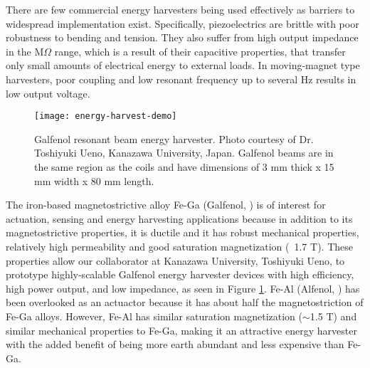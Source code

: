 There are few commercial energy harvesters being used effectively as barriers to widespread implementation exist. Specifically, piezoelectrics are brittle with poor robustness to bending and tension. They also suffer from high output impedance in the M$\Omega$ range, which is a result of their capacitive properties, that transfer only small amounts of electrical energy to external loads. In moving-magnet type harvesters, poor coupling and low resonant frequency up to several Hz results in low output voltage. 
\begin{figure}[h!] %
	\centering
	\texttt{[image: energy-harvest-demo]}
	\caption{Galfenol resonant beam energy harvester. Photo courtesy of Dr. Toshiyuki Ueno, Kanazawa University, Japan. Galfenol beams are in the same region as the coils and have dimensions of 3 mm thick x 15 mm width x 80 mm length.\cite{Slaughter2011}}
	\label{fig:energy-harvest-demo}
\end{figure}
The iron-based magnetostrictive alloy Fe-Ga (Galfenol, \fegacomp) is of interest for actuation, sensing and energy harvesting applications because in addition to its magnetostrictive properties, it is ductile and it has robust mechanical properties\cite{Clark2003}, relatively high permeability and good saturation magnetization (~1.7 T)\cite{Clark2002}. These properties allow our collaborator at Kanazawa University, Toshiyuki Ueno, to prototype highly-scalable Galfenol energy harvester devices with high efficiency, high power output, and low impedance\cite{Ueno2015a}, as seen in Figure \ref{fig:energy-harvest-demo}. Fe-Al (Alfenol, \fealcomp) has been overlooked as an actuactor because it has about half the magnetostriction of Fe-Ga alloys. However, Fe-Al has similar saturation magnetization ($\sim$1.5 T) and similar mechanical properties to Fe-Ga, making it an attractive energy harvester with the added benefit of being more earth abundant and less expensive than Fe-Ga\cite{Na2014a,Raghunath2014a}. 		

